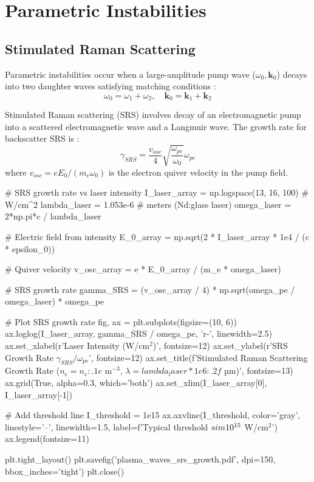 \documentclass[11pt,a4paper]{article}
\begin{document}
\section{Parametric Instabilities}

\subsection{Stimulated Raman Scattering}

Parametric instabilities occur when a large-amplitude pump wave ($\omega_0, \mathbf{k}_0$) decays into two daughter waves satisfying matching conditions \cite{Kruer2003}:
\begin{equation}
\omega_0 = \omega_1 + \omega_2, \quad \mathbf{k}_0 = \mathbf{k}_1 + \mathbf{k}_2
\end{equation}

Stimulated Raman scattering (SRS) involves decay of an electromagnetic pump into a scattered electromagnetic wave and a Langmuir wave. The growth rate for backscatter SRS is \cite{Kruer2003}:
\begin{equation}
\gamma_{SRS} = \frac{v_{osc}}{4} \sqrt{\frac{\omega_{pe}}{\omega_0}} \omega_{pe}
\end{equation}
where $v_{osc} = eE_0/(m_e \omega_0)$ is the electron quiver velocity in the pump field.

\begin{pycode}
# SRS growth rate vs laser intensity
I_laser_array = np.logspace(13, 16, 100)  # W/cm^2
lambda_laser = 1.053e-6  # meters (Nd:glass laser)
omega_laser = 2*np.pi*c / lambda_laser

# Electric field from intensity
E_0_array = np.sqrt(2 * I_laser_array * 1e4 / (c * epsilon_0))

# Quiver velocity
v_osc_array = e * E_0_array / (m_e * omega_laser)

# SRS growth rate
gamma_SRS = (v_osc_array / 4) * np.sqrt(omega_pe / omega_laser) * omega_pe

# Plot SRS growth rate
fig, ax = plt.subplots(figsize=(10, 6))
ax.loglog(I_laser_array, gamma_SRS / omega_pe, 'r-', linewidth=2.5)
ax.set_xlabel(r'Laser Intensity (W/cm$^2$)', fontsize=12)
ax.set_ylabel(r'SRS Growth Rate $\gamma_{SRS}/\omega_{pe}$', fontsize=12)
ax.set_title(f'Stimulated Raman Scattering Growth Rate ($n_e = {n_e:.1e}$ m$^{{-3}}$, $\lambda = {lambda_laser*1e6:.2f}$ µm)',
             fontsize=13)
ax.grid(True, alpha=0.3, which='both')
ax.set_xlim(I_laser_array[0], I_laser_array[-1])

# Add threshold line
I_threshold = 1e15
ax.axvline(I_threshold, color='gray', linestyle='--', linewidth=1.5,
           label=f'Typical threshold $\\sim 10^{{15}}$ W/cm$^2$')
ax.legend(fontsize=11)

plt.tight_layout()
plt.savefig('plasma_waves_srs_growth.pdf', dpi=150, bbox_inches='tight')
plt.close()
\end{pycode}
\end{document}
